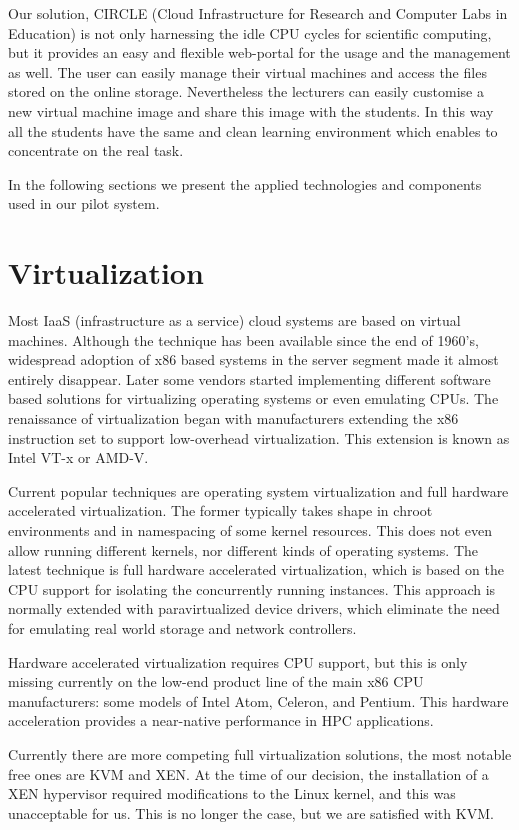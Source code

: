 \documentclass{llncs}
\begin{document}
Our solution, CIRCLE (Cloud Infrastructure for Research and Computer Labs in Education) is not only harnessing the idle CPU cycles for scientific computing, but it provides
an easy and flexible web-portal for the usage and the management as well. The user can easily manage their virtual machines and access the files stored on the online storage. Nevertheless the lecturers can easily customise a new virtual machine image and share this image with the students. In this way all the students have the same and clean learning environment which enables to concentrate on the real task. 

In the following sections we present the applied technologies and components used in our pilot system. 

\section{Virtualization}
Most IaaS (infrastructure as a service) cloud systems are based on virtual machines. Although the technique has been available since the end of 1960's\cite{creasy1981origin}, widespread adoption of x86 based systems in the server segment made it almost entirely disappear. Later some vendors started implementing different software based solutions for virtualizing operating systems or even emulating CPUs. The renaissance of virtualization began with manufacturers extending the x86 instruction set to  support low-overhead virtualization. This extension is known as Intel VT-x or AMD-V.

Current popular techniques are operating system virtualization and full hardware accelerated virtualization. The former typically takes shape in chroot environments and in namespacing of some kernel resources. This does not even allow running different kernels, nor different kinds of operating systems. The latest technique is full hardware accelerated virtualization, which is based on the CPU support for isolating the concurrently running instances. This approach is normally extended with paravirtualized device drivers, which eliminate the need for emulating real world storage and network controllers.

Hardware accelerated virtualization requires CPU support, but this is only missing currently on the low-end product line of the main x86 CPU manufacturers: some models of Intel Atom, Celeron, and Pentium. This hardware acceleration provides a near-native performance in HPC applications.\cite{younge2011analysis}

Currently there are more competing full virtualization solutions, the most notable free ones are KVM and XEN. At the time of our decision, the installation of a XEN hypervisor required modifications to the Linux kernel, and this was unacceptable for us. This is no longer the case, but we are satisfied with KVM.
\end{document}

